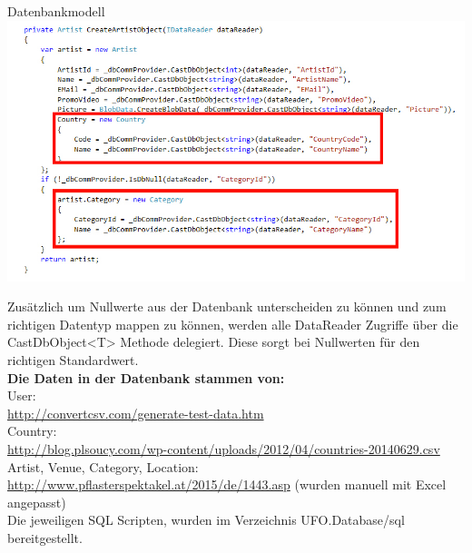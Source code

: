 \begin{section}{Datenbankmodell}
\includegraphics[angle=0, scale=0.45]{./img/viewcodesample.jpg}
\FloatBarrier

Zusätzlich um Nullwerte aus der Datenbank unterscheiden zu können und zum richtigen Datentyp mappen zu können, werden alle DataReader Zugriffe über die CastDbObject<T> Methode delegiert. Diese sorgt bei Nullwerten für den richtigen Standardwert.\\

\textbf{Die Daten in der Datenbank stammen von:} \\
User: \\ \url{http://convertcsv.com/generate-test-data.htm} \\
Country: \\ \url{http://blog.plsoucy.com/wp-content/uploads/2012/04/countries-20140629.csv} \\
Artist, Venue, Category, Location: \\ \url{http://www.pflasterspektakel.at/2015/de/1443.asp} (wurden manuell mit Excel angepasst) \\
Die jeweiligen SQL Scripten, wurden im Verzeichnis UFO.Database/sql bereitgestellt.


\end{section}